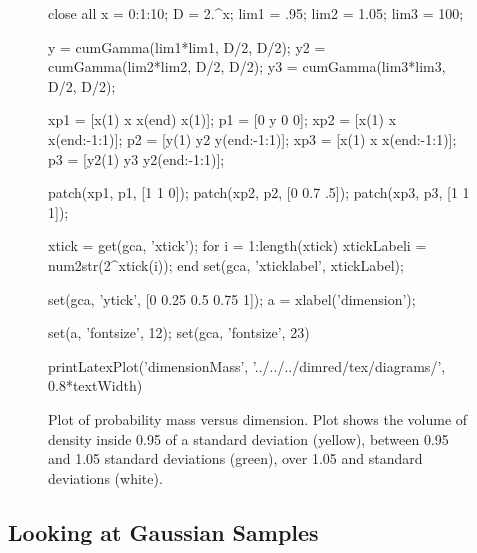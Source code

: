 % 
\begin{figure}
  \begin{matlab}
    close all
    x = 0:1:10;
    D = 2.^x;
    lim1 = .95;
    lim2 = 1.05;
    lim3 = 100;

    y = cumGamma(lim1*lim1, D/2, D/2);
    y2 = cumGamma(lim2*lim2, D/2, D/2);
    y3 = cumGamma(lim3*lim3, D/2, D/2);

    xp1 = [x(1) x x(end) x(1)];
    p1 = [0 y 0 0];
    xp2 = [x(1) x x(end:-1:1)];
    p2 = [y(1) y2 y(end:-1:1)];
    xp3 = [x(1) x x(end:-1:1)];
    p3 = [y2(1) y3 y2(end:-1:1)];

    patch(xp1, p1, [1 1 0]);
    patch(xp2, p2, [0 0.7 .5]);
    patch(xp3, p3, [1 1 1]);

    xtick = get(gca, 'xtick');
    for i = 1:length(xtick)
      xtickLabel{i} =  num2str(2^xtick(i));
    end
    set(gca, 'xticklabel', xtickLabel);

    set(gca, 'ytick', [0 0.25 0.5 0.75 1]);
    a = xlabel('dimension');

    set(a, 'fontsize', 12);
    set(gca, 'fontsize', 23)

    printLatexPlot('dimensionMass', '../../../dimred/tex/diagrams/', 0.8*textWidth)

  \end{matlab}
  \begin{center}
  \end{center}

  \caption{Plot of probability mass versus dimension. Plot shows the
    volume of density inside 0.95 of a standard deviation (yellow),
    between 0.95 and 1.05 standard deviations (green), over 1.05
    and standard deviations (white).}

\end{figure}



\subsection{Looking at Gaussian Samples}

